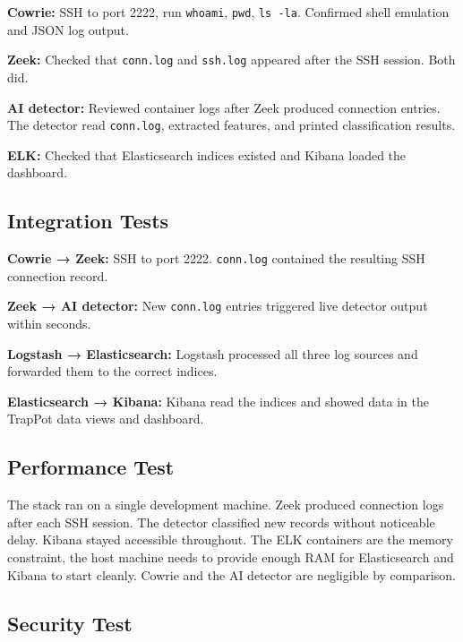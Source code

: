 \textbf{Cowrie:} SSH to port 2222, run \texttt{whoami}, \texttt{pwd}, \texttt{ls -la}. Confirmed shell emulation and JSON log output.

\textbf{Zeek:} Checked that \texttt{conn.log} and \texttt{ssh.log} appeared after the SSH session. Both did.

\textbf{AI detector:} Reviewed container logs after Zeek produced connection entries. The detector read \texttt{conn.log}, extracted features, and printed classification results.

\textbf{ELK:} Checked that Elasticsearch indices existed and Kibana loaded the dashboard.

\subsection{Integration Tests}
\label{subsec:integration_testing}

\textbf{Cowrie → Zeek:} SSH to port 2222. \texttt{conn.log} contained the resulting SSH connection record.

\textbf{Zeek → AI detector:} New \texttt{conn.log} entries triggered live detector output within seconds.

\textbf{Logstash → Elasticsearch:} Logstash processed all three log sources and forwarded them to the correct indices.

\textbf{Elasticsearch → Kibana:} Kibana read the indices and showed data in the TrapPot data views and dashboard.

\subsection{Performance Test}
\label{subsec:performance_testing}

The stack ran on a single development machine. Zeek produced connection logs after each SSH session. The detector classified new records without noticeable delay. Kibana stayed accessible throughout. The ELK containers are the memory constraint, the host machine needs to provide enough RAM for Elasticsearch and Kibana to start cleanly. Cowrie and the AI detector are negligible by comparison.

\subsection{Security Test}
\label{subsec:security_testing}

